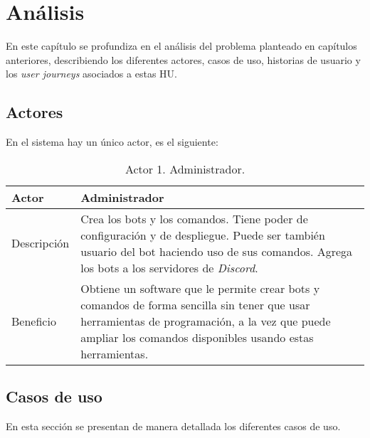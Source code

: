 \chapter{Análisis}

En este capítulo se profundiza en el análisis del problema planteado en capítulos anteriores, describiendo los diferentes actores, casos de uso, historias de usuario y los \textit{user journeys} asociados a estas HU.

\section{Actores}

En el sistema hay un único actor, es el siguiente:

\begin{table}[H]
    \centering
    \def\arraystretch{1.25}
    \begin{adjustbox}{max width=\textwidth}
    \begin{tabularx}{\textwidth}{|l|L|}
    \hline
        \textbf{Actor} & \textbf{Administrador} \\ \hline
    \hline
        Descripción & Crea los bots y los comandos. Tiene poder de configuración y de despliegue. Puede ser también usuario del bot haciendo uso de sus comandos. Agrega los bots a los servidores de \textit{Discord}. \\ \hline
        Beneficio & Obtiene un software que le permite crear bots y comandos de forma sencilla sin tener que usar herramientas de programación, a la vez que puede ampliar los comandos disponibles usando estas herramientas. \\ \hline
    \end{tabularx}
    \end{adjustbox}
    \caption{Actor 1. Administrador.}
\end{table}



\section{Casos de uso}

En esta sección se presentan de manera detallada los diferentes casos de uso.

